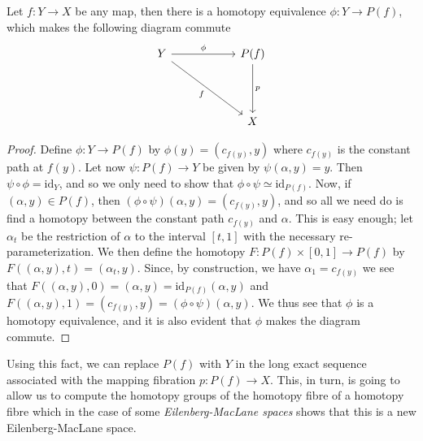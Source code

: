 \documentclass[../main.tex]{subfiles}
\begin{document}
\begin{proposition}
   Let \( f: Y\rightarrow X \) be any map, then there is a
   homotopy equivalence \( \phi:Y\rightarrow P(f) \), which makes the
   following diagram commute
   \begin{equation}
      \begin{tikzcd}
          Y & {} & {P(f)} \\
          && {} \\
          && X
          \arrow["f"', from=1-1, to=3-3]
          \arrow["\phi", from=1-1, to=1-3]
          \arrow["p", from=1-3, to=3-3]
      \end{tikzcd}
   \end{equation}
\end{proposition}
\begin{proof}
   Define \( \phi:Y\rightarrow P(f) \) by \( \phi(y)=(c_{f(y)}, y) \)
   where \( c_{f(y)} \) is the constant path at \( f(y) \). Let now
   \( \psi:P(f)\rightarrow Y \) be given by \( \psi(\alpha, y)=y \).
   Then \( \psi\circ\phi = \text{id}_Y \), and so we only need to show
   that \( \phi\circ\psi \simeq \text{id}_{P(f)} \). Now, if
   \( (\alpha, y)\in P(f) \), then \( (\phi\circ\psi)(\alpha, y)=(c_{f(y)}, y) \),
   and so all we need do is find a homotopy between the constant path
   \( c_{f(y)} \) and \( \alpha \). This is easy enough; let
   \( \alpha_t \) be the restriction of \( \alpha \) to the interval
   \( [t, 1] \) with the necessary re-parameterization. We then
   define the homotopy \( F:P(f)\times [0,1]\rightarrow P(f) \) by
   \( F((\alpha, y), t)=(\alpha_t, y) \). Since, by construction, we have
   \( \alpha_1 = c_{f(y)} \) we see that \( F((\alpha, y), 0)=(\alpha,y)=\text{id}_{P(f)}(\alpha, y) \) and \( F((\alpha, y), 1)=(c_{f(y)},y)=(\phi\circ\psi)(\alpha, y) \).
   We thus see that \( \phi \) is a homotopy equivalence, and it is also
   evident that \( \phi \) makes the diagram commute.
   
\end{proof}
Using this fact, we can replace \( P(f) \) with \( Y \) in the long
exact sequence associated with the mapping fibration \( p:P(f)\rightarrow X \).
This, in turn, is going to allow us to compute the homotopy groups
of the homotopy fibre of a homotopy fibre
which in the case of some \emph{Eilenberg-MacLane spaces} shows that
this is a new Eilenberg-MacLane space.
\end{document}
